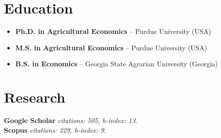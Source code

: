 \documentclass[10pt]{article}
\begin{document}
	
	\section*{Education}
	\begin{itemize}
		\item {} \textbf{Ph.D. in Agricultural Economics} -- Purdue University (USA)
		\item {} \textbf{M.S. in Agricultural Economics} -- Purdue University (USA)
		\item {} \textbf{B.S. in Economics} -- Georgia State Agrarian University (Georgia)
	\end{itemize}
	
	\bigskip
	
	\section*{Research}
	\textbf{Google Scholar} \textsl{citations: 505, h-index: 13}.\\	
	\textbf{Scopus} \textsl{citations: 229, h-index: 9}.	
	
	\begin{refsection}[papers]
		\nocite{ubilava2019el,ubilava2019erl,ubilava2019md,ubilava2018ajae,smith2017gec,ubilava2017wd,tack2015agec,ubilava2014erae,tack2013cc,ubilava2013ems,ubilava2013ajare,ubilava2012agec,ubilava2012agri,ubilava2011jare,ubilava2011jcb,ubilava2010tfsc,ubilava2009fp}
		\printbibliography[heading={papers}]
	\end{refsection}
	\begin{refsection}[papers]
		\nocite{signal_noise,multistep_forecasts,somalia_integration,conflict_seasonal}
		\printbibliography[heading={inprogress},env={nodis}]
	\end{refsection}

	
\end{document}
